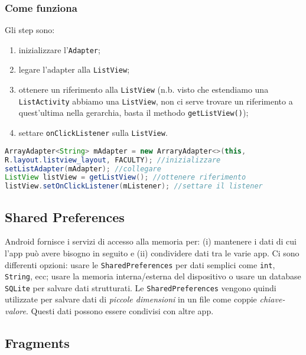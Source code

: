 \subsubsection{Come funziona}

Gli step sono:

\begin{enumerate}
\item inizializzare l'\texttt{Adapter};
\item legare l'adapter alla \texttt{ListView};
\item ottenere un riferimento alla \texttt{ListView} (n.b. visto che estendiamo
una \texttt{ListActivity} abbiamo una \texttt{ListView}, non ci serve trovare un
riferimento a quest'ultima nella gerarchia, basta il methodo
\texttt{getListView()});
\item settare \texttt{onClickListener} sulla \texttt{ListView}.
\end{enumerate}

\begin{lstlisting}[language=Java]
ArrayAdapter<String> mAdapter = new ArraryAdapter<>(this,
R.layout.listview_layout, FACULTY); //inizializzare
setListAdapter(mAdapter); //collegare
ListView listView = getListView(); //ottenere riferimento
listView.setOnClickListener(mListener); //settare il listener
\end{lstlisting}

\subsection{Shared Preferences}

Android fornisce i servizi di accesso alla memoria per: (i) mantenere i dati di
cui l'app può avere bisogno in seguito e (ii) condividere dati tra le varie app.
Ci sono differenti opzioni: usare le \texttt{SharedPreferences} per dati
semplici come \texttt{int}, \texttt{String}, ecc; usare la memoria
interna/esterna del dispositivo o usare un database \texttt{SQLite} per salvare
dati strutturati.
Le \texttt{SharedPreferences} vengono quindi utilizzate per salvare dati di 
\textit{piccole dimensioni} in un file come coppie \textit{chiave-valore}. 
Questi dati possono essere condivisi con altre app.

\subsection{Fragments}

